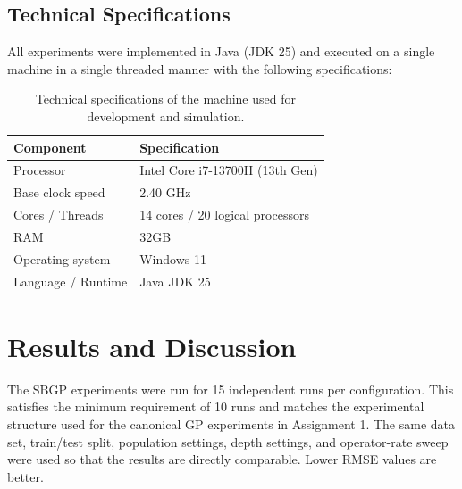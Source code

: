\documentclass{article}
\begin{document}
\subsection{Technical Specifications}

All experiments were implemented in Java (JDK 25) and executed on a single machine in a single threaded manner with the following specifications:

\begin{table}[h]
\centering
\begin{tabular}{ll}
\hline
\textbf{Component} & \textbf{Specification} \\
\hline
Processor           & Intel Core i7-13700H (13th Gen) \\
Base clock speed    & 2.40 GHz \\
Cores / Threads     & 14 cores / 20 logical processors \\
RAM                 & 32GB \\
Operating system    & Windows 11 \\
Language / Runtime  & Java JDK 25 \\
\hline
\end{tabular}
\caption{Technical specifications of the machine used for development and simulation.}
\label{tab:specs}
\end{table}

\section{Results and Discussion}

The SBGP experiments were run for 15 independent runs per configuration. This satisfies the minimum requirement of 10 runs and matches the experimental structure used for the canonical GP experiments in Assignment 1. The same data set, train/test split, population settings, depth settings, and operator-rate sweep were used so that the results are directly comparable. Lower RMSE values are better.
\end{document}
